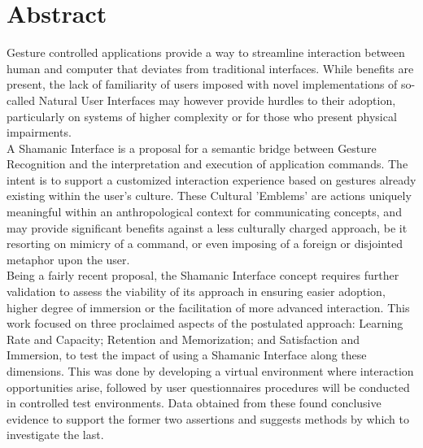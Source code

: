 \begin{comment}
\chapter*{Resumo}
    \begin{dummied}
        Lorem ipsum dolor sit amet
    \end{dummied}
\end{comment}
    
\chapter*{Abstract}
    Gesture controlled applications provide a way to streamline interaction between human and computer that deviates from traditional interfaces. While benefits are present, the lack of familiarity of users imposed with novel implementations of so-called Natural User Interfaces may however provide hurdles to their adoption, particularly on systems of higher complexity or for those who present physical impairments.\\
    A Shamanic Interface is a proposal for a semantic bridge between Gesture Recognition and the interpretation and execution of application commands. The intent is to support a customized interaction experience based on gestures already existing within the user's culture. These Cultural 'Emblems' are actions uniquely meaningful within an anthropological context for communicating concepts, and may provide significant benefits against a less culturally charged approach, be it resorting on mimicry of a command, or even imposing of a foreign or disjointed metaphor upon the user.\\
    Being a fairly recent proposal, the Shamanic Interface concept requires further validation to assess the viability of its approach in ensuring easier adoption, higher degree of immersion or the facilitation of more advanced interaction.
    This work focused on three proclaimed aspects of the postulated approach: Learning Rate and Capacity; Retention and Memorization; and Satisfaction and Immersion, to test the impact of using a Shamanic Interface along these dimensions. This was done by developing a virtual environment where interaction opportunities arise, followed by user questionnaires procedures will be conducted in controlled test environments. Data obtained from these found conclusive evidence to support the former two assertions and suggests methods by which to investigate the last.\\ 


    
